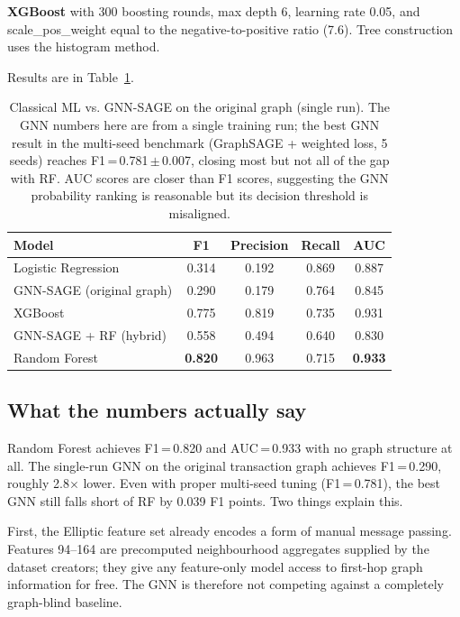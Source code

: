 \textbf{XGBoost} with 300 boosting rounds, max depth 6, learning rate 0.05,
and scale\_pos\_weight equal to the negative-to-positive ratio (7.6). Tree
construction uses the histogram method.

Results are in Table~\ref{tab:classical_vs_gnn}.

\begin{table}[!htbp]
\centering
\caption{Classical ML vs. GNN-SAGE on the original graph (single run).
  The GNN numbers here are from a single training run; the best GNN result
  in the multi-seed benchmark (GraphSAGE + weighted loss, 5 seeds) reaches
  F1\,=\,0.781\,$\pm$\,0.007, closing most but not all of the gap with RF.
  AUC scores are closer than F1 scores, suggesting the GNN probability
  ranking is reasonable but its decision threshold is misaligned.}
\label{tab:classical_vs_gnn}
\small
\begin{tabular}{lcccc}
\toprule
\textbf{Model} & \textbf{F1} & \textbf{Precision} & \textbf{Recall}
  & \textbf{AUC} \\
\midrule
Logistic Regression & 0.314 & 0.192 & 0.869 & 0.887 \\
GNN-SAGE (original graph) & 0.290 & 0.179 & 0.764 & 0.845 \\
XGBoost          & 0.775 & 0.819 & 0.735 & 0.931 \\
GNN-SAGE + RF (hybrid) & 0.558 & 0.494 & 0.640 & 0.830 \\
Random Forest    & \textbf{0.820} & 0.963 & 0.715 & \textbf{0.933} \\
\bottomrule
\end{tabular}
\end{table}

\subsection{What the numbers actually say}

Random Forest achieves F1\,=\,0.820 and AUC\,=\,0.933 with no graph
structure at all. The single-run GNN on the original transaction graph
achieves F1\,=\,0.290, roughly 2.8$\times$ lower. Even with proper
multi-seed tuning (F1\,=\,0.781), the best GNN still falls short of RF by
0.039 F1 points. Two things explain this.

First, the Elliptic feature set already encodes a form of manual message
passing. Features 94--164 are precomputed neighbourhood aggregates supplied
by the dataset creators; they give any feature-only model access to first-hop
graph information for free. The GNN is therefore not competing against a
completely graph-blind baseline.

